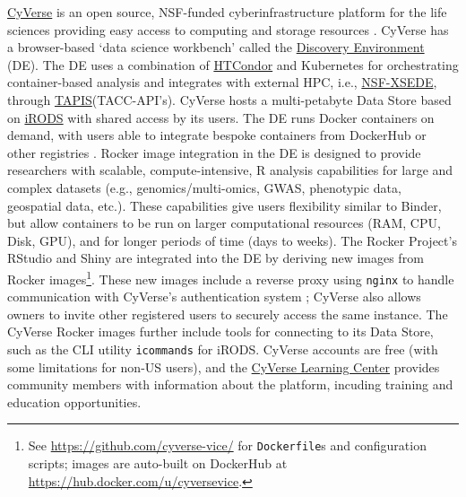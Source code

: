 \href{https://cyverse.org}{CyVerse} is an open source, NSF-funded
cyberinfrastructure platform for the life sciences providing easy access
to computing and storage resources \citep{merchant_iplant_2016}. CyVerse
has a browser-based `data science workbench' called the
\href{https://cyverse.org/discovery-environment}{Discovery Environment}
(DE). The DE uses a combination of
\href{https://research.cs.wisc.edu/htcondor/}{HTCondor} and Kubernetes
for orchestrating container-based analysis and integrates with external
HPC, i.e., \href{https://www.xsede.org/}{NSF-XSEDE}, through
\href{https://www.tacc.utexas.edu/tapis}{TAPIS}(TACC-API's). CyVerse
hosts a multi-petabyte Data Store based on
\href{https://irods.org/}{iRODS} with shared access by its users. The DE
runs Docker containers on demand, with users able to integrate bespoke
containers from DockerHub or other registries
\citep{devisetty_bringing_2016}. Rocker image integration in the DE is
designed to provide researchers with scalable, compute-intensive, R
analysis capabilities for large and complex datasets (e.g.,
genomics/multi-omics, GWAS, phenotypic data, geospatial data, etc.).
These capabilities give users flexibility similar to Binder, but allow
containers to be run on larger computational resources (RAM, CPU, Disk,
GPU), and for longer periods of time (days to weeks). The Rocker
Project's RStudio and Shiny are integrated into the DE by deriving new
images from Rocker
images\footnote{See \href{https://github.com/cyverse-vice/}{https://github.com/cyverse-vice/} for \texttt{Dockerfile}s and configuration scripts; images are auto-built on DockerHub at \href{https://hub.docker.com/u/cyversevice}{https://hub.docker.com/u/cyversevice}.}.
These new images include a reverse proxy using \texttt{nginx} to handle
communication with CyVerse's authentication system
\citep{rstudio_proxy_2020}; CyVerse also allows owners to invite other
registered users to securely access the same instance. The CyVerse
Rocker images further include tools for connecting to its Data Store,
such as the CLI utility \texttt{icommands} for iRODS. CyVerse accounts
are free (with some limitations for non-US users), and the
\href{https://learning.cyverse.org/}{CyVerse Learning Center} provides
community members with information about the platform, incuding training
and education opportunities.

